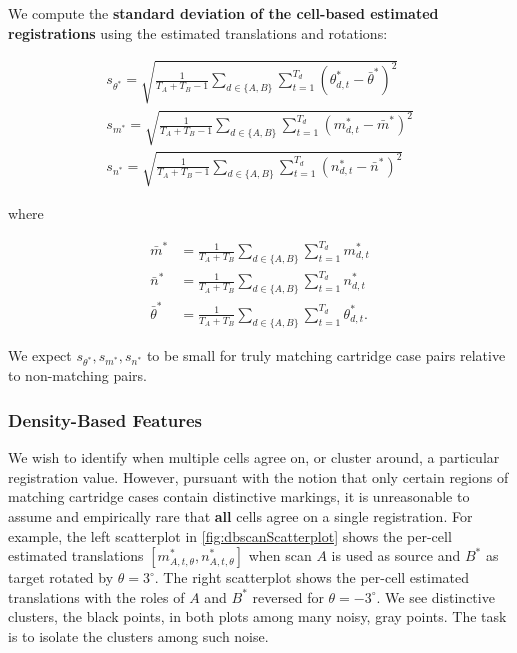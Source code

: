 \documentclass[reprint]{JASA}
\begin{document}
We compute the \textbf{standard deviation of the cell-based estimated
registrations} using the estimated translations and rotations:

\begin{align*}
s_{\theta^*} =  \sqrt{\frac{1}{T_A + T_B - 1} \sum_{d \in \{A,B\}} \sum_{t=1}^{T_d} (\theta^*_{d,t} - \bar{\theta}^*)^2} \\
s_{m^*} =  \sqrt{\frac{1}{T_A + T_B - 1} \sum_{d \in \{A,B\}} \sum_{t=1}^{T_d} (m^*_{d,t} - \bar{m}^*)^2} \\
s_{n^*} = \sqrt{\frac{1}{T_A + T_B - 1} \sum_{d \in \{A,B\}} \sum_{t=1}^{T_d} (n^*_{d,t} - \bar{n}^*)^2}
\end{align*}

where

\begin{align*}
\bar{m}^* &= \frac{1}{T_A + T_B} \sum_{d \in \{A,B\}}\sum_{t=1}^{T_d} m^*_{d,t} \\
\bar{n}^* &= \frac{1}{T_A + T_B} \sum_{d \in \{A,B\}} \sum_{t=1}^{T_d} n^*_{d,t} \\
\bar{\theta}^* &= \frac{1}{T_A + T_B} \sum_{d \in \{A,B\}} \sum_{t=1}^{T_d} \theta^*_{d,t}.
\end{align*}

We expect \(s_{\theta^*}, s_{m^*},s_{n^*}\) to be small for truly
matching cartridge case pairs relative to non-matching pairs.

\hypertarget{density-based-features}{%
\subsubsection{Density-Based Features}\label{density-based-features}}

We wish to identify when multiple cells agree on, or cluster around, a
particular registration value. However, pursuant with the notion that
only certain regions of matching cartridge cases contain distinctive
markings, it is unreasonable to assume and empirically rare that
\textbf{all} cells agree on a single registration. For example, the left
scatterplot in \autoref{fig:dbscanScatterplot} shows the per-cell
estimated translations \([m^*_{A,t,\theta}, n^*_{A,t,\theta}]\) when
scan \(A\) is used as source and \(B^*\) as target rotated by
\(\theta = 3^\circ\). The right scatterplot shows the per-cell estimated
translations with the roles of \(A\) and \(B^*\) reversed for
\(\theta = -3^\circ\). We see distinctive clusters, the black points, in
both plots among many noisy, gray points. The task is to isolate the
clusters among such noise.
\end{document}
